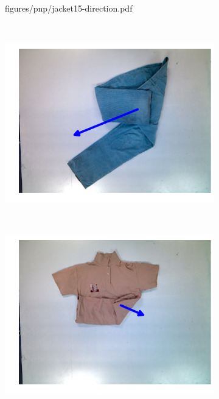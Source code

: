 \begin{figure}[htbp]
\begin{subfigure}[r]{0.49\textwidth}
    	{figures/pnp/jacket15-direction.pdf}
	\end{subfigure} 
	~
	\begin{subfigure}[l]{0.49\textwidth}
	    \centering
    	\includegraphics[width=\textwidth]
    	{figures/pnp/pants19-direction.pdf}
	\end{subfigure}
	~
    \begin{subfigure}[r]{0.49\textwidth}
	    \centering
    	\includegraphics[width=\textwidth]
    	{figures/pnp/polo18-direction.pdf}
	\end{subfigure}
	~
	\begin{subfigure}[l]{0.49\textwidth}
	    \centering

\end{subfigure}
\end{figure}
